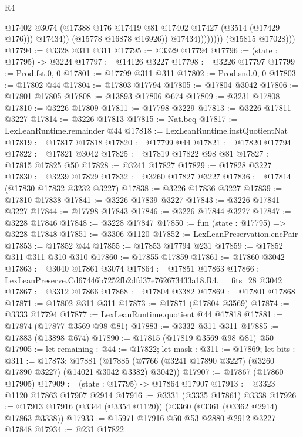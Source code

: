 \begin{lexlean}{R4}
\begin{coremodule}
                              @17402
                              @3074
                              (@17388 @176 @17419 @81 @17402 @17427 (@3514 (@17429 @176)))
                              @17434))
                          (@15778 @16878 @16926))
                        @17434))))))))
        (@15815 @17028)))
@17794 := @3328 @311 @311
@17795 := @3329 @17794
@17796 := (state : @17795) -> @3224
@17797 := @14126 @3227
@17798 := @3226 @17797
@17799 := Prod.fst.{0, 0}
@17801 := @17799 @311 @311
@17802 := Prod.snd.{0, 0}
@17803 := @17802 @44
@17804 := @17803 @17794
@17805 := @17804 @3042
@17806 := @17801 @17805
@17808 := @13893 @17806 @674
@17809 := @3231 @17808
@17810 := @3226 @17809
@17811 := @17798 @3229
@17813 := @3226 @17811 @3227
@17814 := @3226 @17813
@17815 := Nat.beq
@17817 := LexLeanRuntime.remainder @44
@17818 := LexLeanRuntime.instQuotientNat
@17819 := @17817 @17818
@17820 := @17799 @44
@17821 := @17820 @17794
@17822 := @17821 @3042
@17825 := @17819 @17822 @98 @81
@17827 := @17815 @17825 @50
@17828 := @3241 @17827
@17829 := @17828 @3227
@17830 := @3239 @17829
@17832 := @3260 @17827 @3227
@17836 := @17814 (@17830 @17832 @3232 @3227)
@17838 := @3226 @17836 @3227
@17839 := @17810 @17838
@17841 := @3226 @17839 @3227
@17843 := @3226 @17841 @3227
@17844 := @17798 @17843
@17846 := @3226 @17844 @3227
@17847 := @3228 @17846
@17848 := @3228 @17847
@17850 := fun (state : @17795) => @3228 @17848
@17851 := @3306 @1120
@17852 := LexLeanPreservation.encPair
@17853 := @17852 @44
@17855 := @17853 @17794 @231
@17859 := @17852 @311 @311 @310 @310
@17860 := @17855 @17859
@17861 := @17860 @3042
@17863 := @3040 @17861 @3074
@17864 := @17851 @17863
@17866 := LexLeanPreserve.Cd67446b7252fb2dfd37e762673433a18.R4.__fits_28 @3042
@17867 := @3312 @17866
@17868 := @17804 @3382
@17869 := @17801 @17868
@17871 := @17802 @311 @311
@17873 := @17871 (@17804 @3569)
@17874 := @3333 @17794
@17877 := LexLeanRuntime.quotient @44 @17818
@17881 := @17874 (@17877 @3569 @98 @81)
@17883 := @3332 @311 @311
@17885 := @17883 (@13898 @674)
@17890 := @17815 (@17819 @3569 @98 @81) @50
@17905 := let remaining : @44 := @17822;
  let mask : @311 := @17869;
  let bits : @311 := @17873;
  @17881 (@17885 (@7766 (@3241 @17890 @3227) (@3260 @17890 @3227) (@14021 @3042 @3382) @3042))
@17907 := @17867 (@17860 @17905)
@17909 := (state : @17795) -> @17864 @17907
@17913 := @3323 @1120 @17863 @17907 @2914
@17916 := @3331 (@3335 @17861) @3338
@17926 := @17913 @17916 (@3344 (@3354 @1120)) (@3360 (@3361 (@3362 @2914) @17863 @3338))
@17933 := @15971 @17916 @50 @53 @2880 @2912 @3227 @17848
@17934 := @231 @17822

\end{coremodule}
\end{lexlean}
